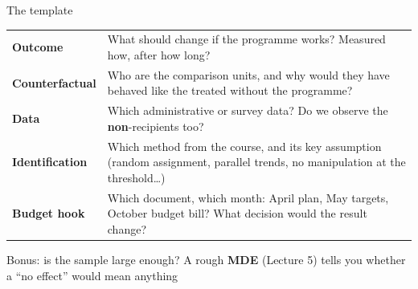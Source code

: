\documentclass[aspectratio=169,xcolor=table]{beamer}
\begin{document}
\begin{frame}{The template}
\centering\footnotesize
\begin{tabular}{L{2.9cm}L{9.3cm}}
\toprule
\textbf{Outcome} & What should change if the programme works? Measured how, after how long? \\
\textbf{Counterfactual} & Who are the comparison units, and why would they have behaved like the treated without the programme? \\
\textbf{Data} & Which administrative or survey data? Do we observe the \textbf{non}-recipients too? \\
\textbf{Identification} & Which method from the course, and its key assumption (random assignment, parallel trends, no manipulation at the threshold\ldots) \\
\textbf{Budget hook} & Which document, which month: April plan, May targets, October budget bill? What decision would the result change? \\
\bottomrule
\end{tabular}
\vspace{0.15cm}

\raggedright\small
Bonus: is the sample large enough? A rough \textbf{MDE} (Lecture 5) tells you whether a ``no effect'' would mean anything
\end{frame}
\end{document}
